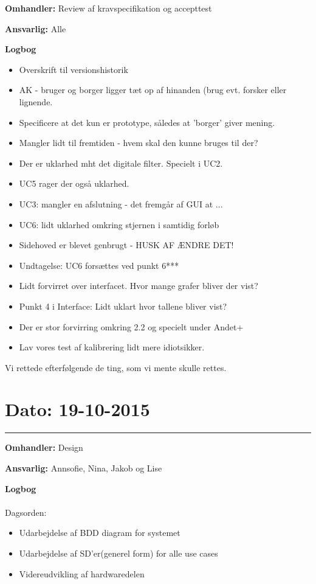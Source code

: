\textbf{Omhandler:} Review af kravspecifikation og accepttest 

\textbf{Ansvarlig:} Alle

\textbf{Logbog}
\\
\begin{itemize}
	\item Overskrift til versionshistorik
	\item AK - bruger og borger ligger tæt op af hinanden (brug evt. forsker eller lignende.
	\item Specificere at det kun er prototype, således at 'borger' giver mening.
	\item Mangler lidt til fremtiden - hvem skal den kunne bruges til der?
	\item Der er uklarhed mht det digitale filter. Specielt i UC2.
	\item UC5 rager der også uklarhed.
	\item UC3: mangler en afslutning - det fremgår af GUI at ...
	\item UC6: lidt uklarhed omkring stjernen i samtidig forløb
	\item Sidehoved er blevet genbrugt - HUSK AF ÆNDRE DET!
	\item Undtagelse: UC6 forsættes ved punkt 6***
	\item Lidt forvirret over interfacet. Hvor mange grafer bliver der vist? 
	\item Punkt 4 i Interface: Lidt uklart hvor tallene bliver vist?
	\item Der er stor forvirring omkring 2.2 og specielt under Andet+
	\item Lav vores test af kalibrering lidt mere idiotsikker. 
\end{itemize}

Vi rettede efterfølgende de ting, som vi mente skulle rettes.

\section{Dato: 19-10-2015 }
\hrule

\textbf{Omhandler:} Design 

\textbf{Ansvarlig:} Annsofie, Nina, Jakob og Lise

\textbf{Logbog}
\\
\\
Dagsorden:
\begin{itemize}
	\item Udarbejdelse af BDD diagram for systemet
	\item Udarbejdelse af SD'er(generel form) for alle use cases
	\item Videreudvikling af hardwaredelen
\end{itemize}

